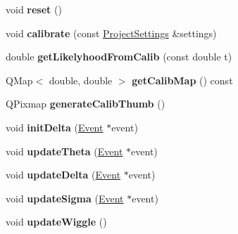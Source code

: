 \begin{DoxyCompactItemize}
\item 
\hypertarget{class_date_ab3717fd1188db061cfbf30a1c2cbd47e}{void {\bfseries reset} ()}\label{class_date_ab3717fd1188db061cfbf30a1c2cbd47e}

\item 
\hypertarget{class_date_aaa74dfb5e315dc932bf512e764a37ef3}{void {\bfseries calibrate} (const \hyperlink{class_project_settings}{Project\-Settings} \&settings)}\label{class_date_aaa74dfb5e315dc932bf512e764a37ef3}

\item 
\hypertarget{class_date_a0739a0db576ebe0bb4e43e1e72504474}{double {\bfseries get\-Likelyhood\-From\-Calib} (const double t)}\label{class_date_a0739a0db576ebe0bb4e43e1e72504474}

\item 
\hypertarget{class_date_a8f627333c177c5fb4f8f90f70ba5d4b0}{Q\-Map$<$ double, double $>$ {\bfseries get\-Calib\-Map} () const }\label{class_date_a8f627333c177c5fb4f8f90f70ba5d4b0}

\item 
\hypertarget{class_date_aed548b84f15e61925a525c98b3e9dfbc}{Q\-Pixmap {\bfseries generate\-Calib\-Thumb} ()}\label{class_date_aed548b84f15e61925a525c98b3e9dfbc}

\item 
\hypertarget{class_date_a479b561f73105f01b28fc41540043391}{void {\bfseries init\-Delta} (\hyperlink{class_event}{Event} $\ast$event)}\label{class_date_a479b561f73105f01b28fc41540043391}

\item 
\hypertarget{class_date_ab0e188485812b31eec69c87b40dace16}{void {\bfseries update\-Theta} (\hyperlink{class_event}{Event} $\ast$event)}\label{class_date_ab0e188485812b31eec69c87b40dace16}

\item 
\hypertarget{class_date_ae5f0538ae5bbf5f4010ba6c179f381d6}{void {\bfseries update\-Delta} (\hyperlink{class_event}{Event} $\ast$event)}\label{class_date_ae5f0538ae5bbf5f4010ba6c179f381d6}

\item 
\hypertarget{class_date_aff897b463d4d6f1d4720a35d6bbffdbb}{void {\bfseries update\-Sigma} (\hyperlink{class_event}{Event} $\ast$event)}\label{class_date_aff897b463d4d6f1d4720a35d6bbffdbb}

\item 
\hypertarget{class_date_a4f0f7ebe66e171427792230c73385cd9}{void {\bfseries update\-Wiggle} ()}\label{class_date_a4f0f7ebe66e171427792230c73385cd9}

\end{DoxyCompactItemize}
